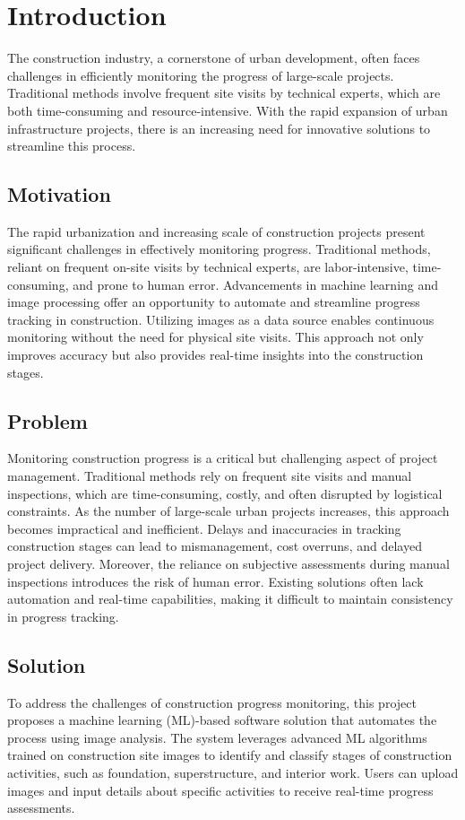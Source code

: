 \documentclass[12pt,a4paper]{report}
\begin{document}
\chapter{Introduction}
\label{chap:introduction-unique}

The construction industry, a cornerstone of urban development, often faces challenges in efficiently monitoring the progress of large-scale projects. Traditional methods involve frequent site visits by technical experts, which are both time-consuming and resource-intensive. With the rapid expansion of urban infrastructure projects, there is an increasing need for innovative solutions to streamline this process.

\section{Motivation}
\label{sec:motivation-unique}
The rapid urbanization and increasing scale of construction projects present significant challenges in effectively monitoring progress. Traditional methods, reliant on frequent on-site visits by technical experts, are labor-intensive, time-consuming, and prone to human error. Advancements in machine learning and image processing offer an opportunity to automate and streamline progress tracking in construction. Utilizing images as a data source enables continuous monitoring without the need for physical site visits. This approach not only improves accuracy but also provides real-time insights into the construction stages.

\section{Problem}
\label{sec:problem-unique}
Monitoring construction progress is a critical but challenging aspect of project management. Traditional methods rely on frequent site visits and manual inspections, which are time-consuming, costly, and often disrupted by logistical constraints. As the number of large-scale urban projects increases, this approach becomes impractical and inefficient. Delays and inaccuracies in tracking construction stages can lead to mismanagement, cost overruns, and delayed project delivery. Moreover, the reliance on subjective assessments during manual inspections introduces the risk of human error. Existing solutions often lack automation and real-time capabilities, making it difficult to maintain consistency in progress tracking.

\section{Solution}
\label{sec:solution-unique}
To address the challenges of construction progress monitoring, this project proposes a machine learning (ML)-based software solution that automates the process using image analysis. The system leverages advanced ML algorithms trained on construction site images to identify and classify stages of construction activities, such as foundation, superstructure, and interior work. Users can upload images and input details about specific activities to receive real-time progress assessments.
\end{document}
